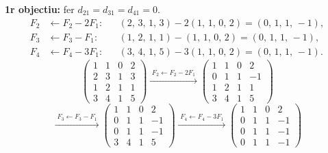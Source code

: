 \documentclass[12pt,a4paper]{article}
\newcommand{\gaussFletxa}[1]{%
  \mathrel{\xrightarrow{\;\scriptstyle #1\;}}%
}
\begin{document}
\textbf{1r objectiu:} fer $d_{21}=d_{31}=d_{41}=0$.
{\setlength{\arraycolsep}{2.2pt}%
\[
  \begin{aligned}
    F_2 &\leftarrow F_2 - 2F_1:
    && (2,\,3,\,1,\,3) - 2(1,\,1,\,0,\,2) = (0,\,1,\,1,\,-1),\\
    F_3 &\leftarrow F_3 - F_1:
    && (1,\,2,\,1,\,1) - (1,\,1,\,0,\,2) = (0,\,1,\,1,\,-1),\\
    F_4 &\leftarrow F_4 - 3F_1:
    && (3,\,4,\,1,\,5) - 3(1,\,1,\,0,\,2) = (0,\,1,\,1,\,-1).
  \end{aligned}
\]
\[
  \begin{pmatrix} 1 & 1 & 0 & 2 \\ 2 & 3 & 1 & 3 \\ 1 & 2 & 1 & 1 \\ 3 & 4 & 1 & 5 \end{pmatrix}
  \gaussFletxa{F_2 \leftarrow F_2 - 2F_1}
  \begin{pmatrix} 1 & 1 & 0 & 2 \\ 0 & 1 & 1 & -1 \\ 1 & 2 & 1 & 1 \\ 3 & 4 & 1 & 5 \end{pmatrix}
\]
\[
  \gaussFletxa{F_3 \leftarrow F_3 - F_1}
  \begin{pmatrix} 1 & 1 & 0 & 2 \\ 0 & 1 & 1 & -1 \\ 0 & 1 & 1 & -1 \\ 3 & 4 & 1 & 5 \end{pmatrix}
  \gaussFletxa{F_4 \leftarrow F_4 - 3F_1}
  \begin{pmatrix} 1 & 1 & 0 & 2 \\ 0 & 1 & 1 & -1 \\ 0 & 1 & 1 & -1 \\ 0 & 1 & 1 & -1 \end{pmatrix}
\]
}
\end{document}

